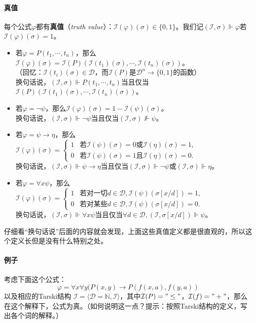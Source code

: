 \documentclass[b5paper,oneside]{ctexbook}
\begin{document}
\paragraph{真值}每个公式$\varphi$都有\textbf{真值}（\textit{truth value}）：$\mathscr I(\varphi)(\sigma )\in\{0,1\}$。我们记$(\mathscr I,\sigma)\Vdash\varphi$若$\mathscr I(\varphi)(\sigma)=1$。
\begin{itemize}
\item 若$\varphi=P(t_1,\cdots ,t_n)$，那么$\mathscr I(\varphi)(\sigma)=\mathcal I(P)(\mathscr I(t_1)(\sigma),\cdots ,\mathscr I(t_n)(\sigma))$。\\（回忆：$\mathscr I(t_i)(\sigma)\in\mathcal{D}$，而$\mathcal{I}(P)$是$\mathcal{D}^n\to\{0,1\}$的函数）\\换句话说，$(\mathscr I,\sigma)\Vdash P(t_1,\cdots ,t_n)$当且仅当$\mathcal{I}(P)(\mathscr I(t_1)(\sigma),\cdots ,\mathscr I(t_n)(\sigma))$。
\item 若$\varphi=\neg\psi$，那么$\mathscr I(\varphi)(\sigma)=1-\mathscr I(\psi)(\sigma)$。\\换句话说，$(\mathscr I,\sigma)\Vdash \neg\psi$当且仅当$(\mathscr I,\sigma)\not\Vdash\psi$。
\item 若$\varphi=\psi\to\eta$，那么$\mathscr I(\varphi)(\sigma)=\begin{cases}1&\text{若}\mathscr I(\psi)(\sigma)=0\text{或}\mathscr I(\eta)(\sigma)=1,\\0&\text{若}\mathscr I(\psi)(\sigma)=1\text{且}\mathscr I(\eta)(\sigma)=0.\end{cases}$\\换句话说，$(\mathscr I,\sigma)\Vdash \psi\to\eta$当且仅当$(\mathscr I,\sigma)\Vdash\neg\psi$或$(\mathscr I,\sigma)\Vdash\eta$。
\item 若$\varphi=\forall x\psi$，那么$\mathscr I(\varphi)(\sigma)=\begin{cases}1&\text{若对一切}d\in\mathcal D,\mathscr I(\psi)(\sigma [x/d])=1,\\0&\text{若对某些}d\in\mathcal D,\mathscr I(\psi)(\sigma [x/d])=0.\end{cases}$\\换句话说，$(\mathscr I,\sigma)\Vdash \forall x\psi$当且仅当$\forall d\in\mathcal D,(\mathscr I,\sigma [x/d])\Vdash\psi$。
\end{itemize}
仔细看“换句话说”后面的内容就会发现，上面这些真值定义都是很直观的，所以这个定义长但是没有什么特别之处。
\paragraph{例子}考虑下面这个公式：
\[\varphi=\forall x\forall y(P(x,y)\to P(f(x,a),f(y,a))\]
以及相应的Tarski结构
$\mathscr{I}=\langle\mathcal{D}=\mathbb{N},\mathcal{I}\rangle$，其中$\mathcal{I}(P)="\leq "$，$\mathcal{I}(f)="+"$，那么在这个解释下，公式为真。（如何说明这一点？提示：按照Tarski结构的定义，写出各个词的解释。）
\end{document}
